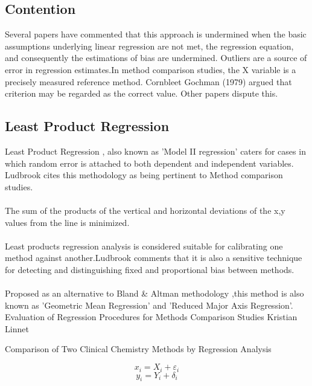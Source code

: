 


\subsection{Contention }
Several papers have commented that this approach is undermined
when the basic assumptions underlying linear regression are not
met, the regression equation, and consequently the estimations of
bias are undermined. Outliers are a source of error in regression
estimates.In method comparison studies, the X variable is a
precisely measured reference method. Cornbleet Gochman (1979)
argued that criterion may be regarded as the correct value. Other
papers dispute this.
\subsection{Least Product Regression}
Least Product Regression , also known as 'Model II regression'
caters for cases in which random error is attached to both
dependent and independent variables. Ludbrook cites this
methodology as being pertinent to Method comparison studies.
\\
\\
The sum of the products of the vertical and horizontal deviations
of the x,y values from the line is minimized.
\\
\\
Least products regression analysis is considered suitable for
calibrating one method against another.Ludbrook comments that it
is also a sensitive technique for detecting and distinguishing
fixed and proportional bias between methods.
\\
\\
Proposed as an alternative to Bland \& Altman methodology ,this
method is also known as 'Geometric Mean Regression' and 'Reduced
Major Axis Regression'.
Evaluation of Regression Procedures for Methods Comparison Studies
Kristian Linnet

Comparison of Two Clinical Chemistry Methods by Regression Analysis

\[ x_i = X_i + \varepsilon_i \]
\[ y_i = Y_i + \delta_i \]


